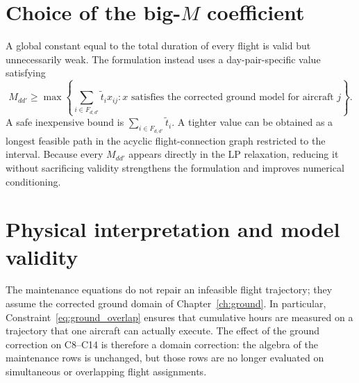 \section{Choice of the big-$M$ coefficient}

A global constant equal to the total duration of every flight is valid but
unnecessarily weak. The formulation instead uses a day-pair-specific value
satisfying
\begin{equation}
    M_{dd'}\geq
    \max\left\{
      \sum_{i\in F_{d,d'}}\tilde t_i x_{ij}:
      x\text{ satisfies the corrected ground model for aircraft }j
    \right\}.
    \label{eq:maintenance_big_m}
\end{equation}
A safe inexpensive bound is $\sum_{i\in F_{d,d'}}\tilde t_i$. A tighter value
can be obtained as a longest feasible path in the acyclic flight-connection
graph restricted to the interval. Because every $M_{dd'}$ appears directly in
the LP relaxation, reducing it without sacrificing validity strengthens the
formulation and improves numerical conditioning.

\section{Physical interpretation and model validity}

The maintenance equations do not repair an infeasible flight trajectory; they
assume the corrected ground domain of Chapter~\ref{ch:ground}. In particular,
Constraint~\eqref{eq:ground_overlap} ensures that cumulative hours are measured
on a trajectory that one aircraft can actually execute. The effect of the
ground correction on C8--C14 is therefore a domain correction: the algebra of
the maintenance rows is unchanged, but those rows are no longer evaluated on
simultaneous or overlapping flight assignments.

